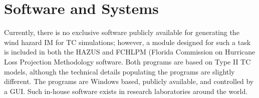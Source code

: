 \section{Software and Systems}
\label{sec:storm_wind_tools}

Currently, there is no exclusive software publicly available for generating the wind hazard IM for TC simulations; however, a module designed for such a task is included in both the HAZUS \citep{vickery2006hazusmh} and FCHLPM (Florida Commission on Hurricane Loss Projection Methodology \citep{hamid2010predicting, powell2005state} software. Both programs are based on Type II TC models, although the technical details populating the programs are slightly different. The programs are Windows based, publicly available, and controlled by a GUI. Such in-house software exists in research laboratories around the world.

